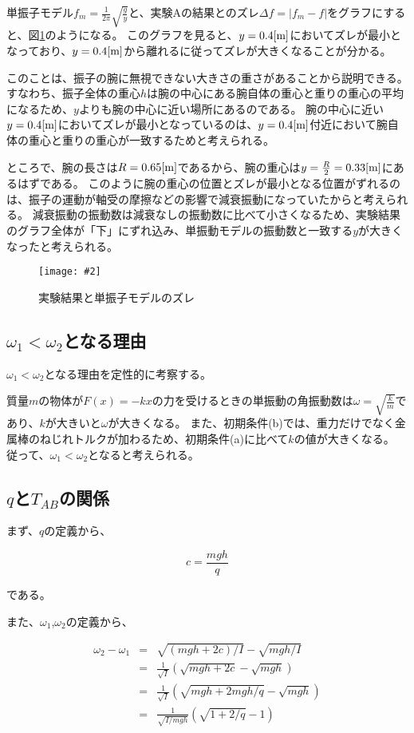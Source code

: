 \documentclass[uplatex,11pt]{jsarticle}
\newcommand{\fg}[3]{ %
    \begin{figure}
        \begin{center}
            \texttt{[image: \#2]}
            \caption{#3}
            \label{fg_#1}
        \end{center}
    \end{figure}
}
\newcommand{\fr}[1]{図\ref{fg_#1}}
\begin{document}
単振子モデル$f_m = \frac{1}{2\pi}\sqrt{\frac{g}{y}}$と、実験Aの結果とのズレ$\Delta f = |f_m - f|$をグラフにすると、\fr{difference_from_model_A}のようになる。
このグラフを見ると、$y=0.4[{\rm m}]$においてズレが最小となっており、$y=0.4[{\rm m}]$から離れるに従ってズレが大きくなることが分かる。

このことは、振子の腕に無視できない大きさの重さがあることから説明できる。
すなわち、振子全体の重心$h$は腕の中心にある腕自体の重心と重りの重心の平均になるため、$y$よりも腕の中心に近い場所にあるのである。
腕の中心に近い$y=0.4[{\rm m}]$においてズレが最小となっているのは、$y=0.4[{\rm m}]$付近において腕自体の重心と重りの重心が一致するためと考えられる。

ところで、腕の長さは$R = 0.65[{\rm m}]$であるから、腕の重心は$y=\frac{R}{2}=0.33[{\rm m}]$にあるはずである。
このように腕の重心の位置とズレが最小となる位置がずれるのは、振子の運動が軸受の摩擦などの影響で減衰振動になっていたからと考えられる。
減衰振動の振動数は減衰なしの振動数に比べて小さくなるため、実験結果のグラフ全体が「下」にずれ込み、単振動モデルの振動数と一致する$y$が大きくなったと考えられる。

\fg{difference_from_model_A}{graph/a_abs_error.png}{実験結果と単振子モデルのズレ}

\subsection{$\omega_1 < \omega_2$となる理由}

$\omega_1 < \omega_2$となる理由を定性的に考察する。

質量$m$の物体が$F(x) = -kx$の力を受けるときの単振動の角振動数は$\omega = \sqrt{\frac{k}{m}}$であり、$k$が大きいと$\omega$が大きくなる。
また、初期条件(b)では、重力だけでなく金属棒のねじれトルクが加わるため、初期条件(a)に比べて$k$の値が大きくなる。
従って、$\omega_1 < \omega_2$となると考えられる。

\subsection{$q$と$T_{AB}$の関係}

まず、$q$の定義から、

\[
    c = \frac{mgh}{q}
\]

である。

また、$\omega_1$,$\omega_2$の定義から、

\begin{eqnarray*}
    \omega_2 - \omega_1 & = & \sqrt{(mgh+2c)/I} - \sqrt{mgh/I} \\
                        & = & \frac{1}{\sqrt{I}}\left( \sqrt{mgh + 2c} - \sqrt{mgh} \right) \\
                        & = & \frac{1}{\sqrt{I}}\left( \sqrt{mgh + 2mgh/q} - \sqrt{mgh} \right) \\
                        & = & \frac{1}{\sqrt{I/mgh}}\left( \sqrt{1 + 2/q} - 1 \right)
\end{eqnarray*}
\end{document}
